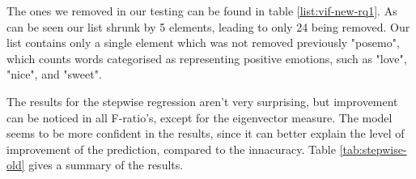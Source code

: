 \documentclass[bsc,frontabs,twoside,singlespacing,parskip,deptreport]{infthesis}
\begin{document}
\begin{table}[!h]
\centering
{}
\caption{Predictors that were removed in the limited dataset}
\label{list:vif-old-rq1}
\end{table}

The ones we removed in our testing can be found in table \ref{list:vif-new-rq1}. As can be seen our list shrunk by 5 elements, leading to only 24 being removed. Our list contains only a single element which was not removed previously "posemo", which counts words categorised as representing positive emotions, such as "love", "nice", and "sweet".

\begin{table}[!h]
\centering
{}
\caption{Predictors that were removed in the expanded dataset}
\label{list:vif-new-rq1}
\end{table}

\newpage

The results for the stepwise regression aren't very surprising, but improvement can be noticed in all F-ratio's, except for the eigenvector measure. The model seems to be more confident in the results, since it can better explain the level of improvement of the prediction, compared to the innacuracy. Table \ref{tab:stepwise-old} gives a summary of the results.
\end{document}
